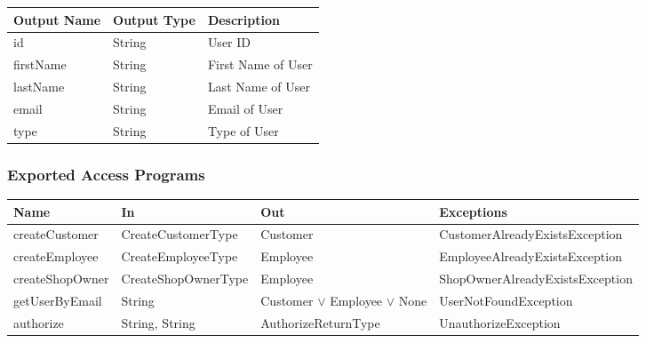 \documentclass[12pt, titlepage]{article}
\begin{document}
\begin{table}[H]
	\begin{tabular}{|l|l|l|}
		\hline
		\textbf{Output Name} & \textbf{Output Type} & \textbf{Description} \\
		\hline
		id                   & String               & User ID              \\
		\hline
		firstName            & String               & First Name of User   \\
		\hline
		lastName             & String               & Last Name of User    \\
		\hline
		email                & String               & Email of User        \\
		\hline
		type                 & String               & Type of User         \\
		\hline
	\end{tabular}
\end{table}

\subsubsection{Exported Access Programs}

\begin{center}
	\begin{adjustbox}{width=\textwidth}
		\begin{tabular}{llll}
			\hline
			\textbf{Name}   & \textbf{In}         & \textbf{Out}                         & \textbf{Exceptions}             \\
			\hline
			createCustomer  & CreateCustomerType  & Customer                             & CustomerAlreadyExistsException  \\
			createEmployee  & CreateEmployeeType  & Employee                             & EmployeeAlreadyExistsException  \\
			createShopOwner & CreateShopOwnerType & Employee                             & ShopOwnerAlreadyExistsException \\
			getUserByEmail  & String              & Customer $\lor$ Employee $\lor$ None & UserNotFoundException           \\
			authorize       & String, String      & AuthorizeReturnType                  & UnauthorizeException            \\
			\hline
		\end{tabular}
	\end{adjustbox}
\end{center}
\end{document}
